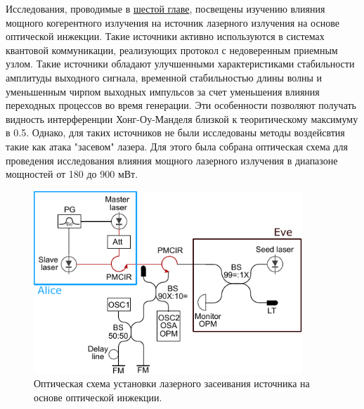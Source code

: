 \newpage Исследования, проводимые в \underline{шестой главе}, посвещены изучению влияния мощного когерентного излучения на источник лазерного излучения на основе оптической инжекции. Такие источники активно используются в системах квантовой коммуникации, реализующих протокол с недоверенным приемным узлом. Такие источники обладают улучшенными характеристиками стабильности амплитуды выходного сигнала, временной стабильностью длины волны и уменьшенным чирпом выходных импульсов за счет уменьшения влияния переходных процессов во время генерации. Эти особенности позволяют получать видность интерференции Хонг-Оу-Манделя близкой к теоритическому максимуму в 0.5. 
\newline Однако, для таких источников не были исследованы методы воздейсвтия такие как атака "засевом" лазера. Для этого была собрана оптическая схема для проведения исследования влияния мощного лазерного излучения в диапазоне мощностей от 180 до 900 мВт. 
\begin{figure}
    \centering
    \includegraphics[width=0.9\textwidth]{images/setup_Faraday_Mirrors_final.pdf}
    \caption{Оптическая схема установки лазерного засеивания источника на основе оптической инжекции.}
    \label{fig:enter-label}
\end{figure}

